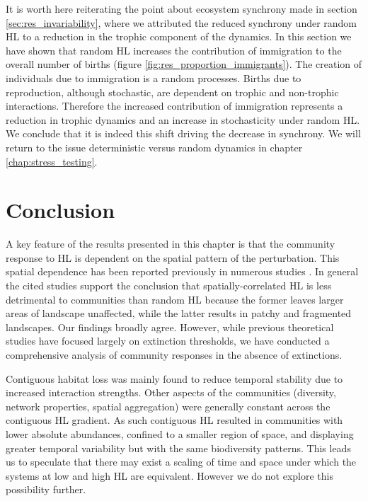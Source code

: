It is worth here reiterating the point about ecosystem synchrony made in section \ref{sec:res_invariability}, where we attributed the reduced synchrony under random HL to a reduction in the trophic component of the dynamics. In this section we have shown that random HL increases the contribution of immigration to the overall number of births (figure \ref{fig:res_proportion_immigrants}). The creation of individuals due to immigration is a random processes. Births due to reproduction, although stochastic, are dependent on trophic and non-trophic interactions. Therefore the increased contribution of immigration represents a reduction in trophic dynamics and an increase in stochasticity under random HL. We conclude that it is indeed this shift driving the decrease in synchrony. We will return to the issue  deterministic versus random dynamics in chapter \ref{chap:stress_testing}.


\clearpage
\section{Conclusion}
\label{sec:hir_discussion}

A key feature of the results presented in this chapter is that the community response to HL is dependent on the spatial pattern of the perturbation. This spatial dependence has been reported previously in numerous studies \cite{jager2006simulated,dytham1995effect,hill1999habitat,travis2003climate,sole2006ecological,with1999extinction,ovaskainen2002metapopulation}.
In general the cited studies support the conclusion that spatially-correlated HL is less detrimental to communities than random HL because the former leaves larger areas of landscape unaffected, while the latter results in patchy and fragmented landscapes. Our findings broadly agree. However, while previous theoretical studies have focused largely on extinction thresholds, we have conducted a comprehensive analysis of community responses in the absence of extinctions. 

Contiguous habitat loss was mainly found to reduce temporal stability due to increased interaction strengths. Other aspects of the communities (diversity, network properties, spatial aggregation) were generally constant across the contiguous HL gradient. As such contiguous HL resulted in communities with lower absolute abundances, confined to a smaller region of space, and displaying greater temporal variability but with the same biodiversity patterns. This leads us to speculate that there may exist a scaling of time and space under which the systems at low and high HL are equivalent. However we do not explore this possibility further. 

